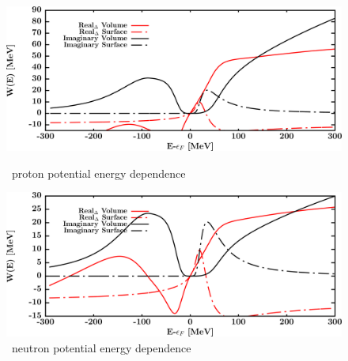 \begin{figure}[hbtp]
    \centering
    \begin{minipage}{0.42\textwidth}
        \centering
        \includegraphics[width=\textwidth]{figures/ni64_protonPotentials.png}
        \caption*{\footnotesize\niFour\ proton potential energy dependence}
        \label{DOMFitData_ni64_proton_potentialComponent_energy}
    \end{minipage}\hspace{6pt}
    \begin{minipage}{0.42\textwidth}
        \centering
        \includegraphics[width=\textwidth]{figures/ni64_neutronPotentials.png}
        \caption*{\footnotesize\niFour\ neutron potential energy dependence}
        \label{DOMFitData_ni64_neutron_potentialComponent_energy}
    \end{minipage}
\end{figure}
